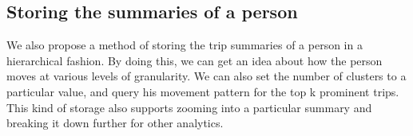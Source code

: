 \subsection{ Storing the summaries of a person}

\par We also propose a method of storing the trip summaries of  a person in a hierarchical fashion. By doing this, we can get an idea about how the person moves at various levels of granularity. We can also set the number of clusters to a particular value, and query his movement pattern for the top k prominent trips. This kind of storage also supports zooming into a particular summary and breaking it down further for other analytics.